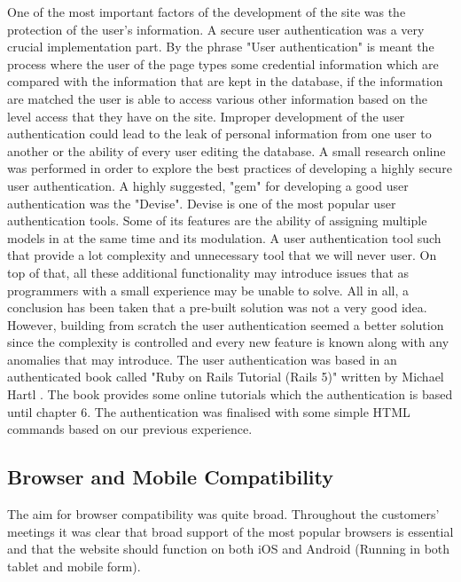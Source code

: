 \documentclass{l3proj}
\begin{document}
One of the most important factors of the development of the site was the protection of the user's information.  A secure user authentication was a very crucial implementation part. By the phrase "User authentication" \cite{authentication} is meant the process where the user of the page types some credential information which are compared with the information that are kept in the database, if the information are matched the user is able to access various other information based on the level access that they have on the site. Improper development of the user authentication could lead to the leak of personal information from one user to another or the ability of every user editing the database. A small research online was performed in order to explore the best practices of developing a highly secure user authentication. A highly suggested, "gem" for developing a good user authentication was the "Devise". \cite{devise} Devise is one of the most popular user authentication tools. Some of its features are the ability of assigning multiple models in at the same time and its modulation. A user authentication tool such that provide a lot complexity and unnecessary tool that we will never user. On top of that, all these additional functionality may introduce issues that as programmers with a small experience may be unable to solve. All in all, a conclusion has been taken that a pre-built solution was not a very good idea. However, building from scratch the user authentication seemed a better solution since the complexity is controlled and every new feature is known along with any anomalies that may introduce. The user authentication was based in an authenticated book called "Ruby on Rails Tutorial (Rails 5)" written by Michael Hartl \cite{railsTut}. The book provides some online tutorials which the authentication is based until chapter 6. The authentication was finalised with some simple HTML commands based on our previous experience.


\subsection{Browser and Mobile Compatibility}
\label{sec:compatibility}

The aim for browser compatibility was quite broad. Throughout the customers' meetings it was clear that broad support of the most popular browsers is essential and that the website should function on both iOS and Android (Running in both tablet and mobile form).
\end{document}
